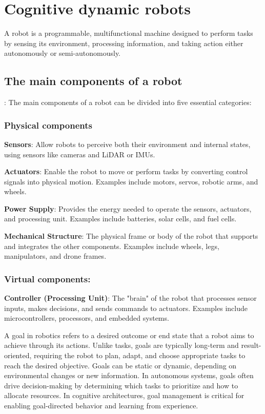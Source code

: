 \chapter{Cognitive dynamic robots}
A robot is a programmable, multifunctional machine designed to perform tasks by sensing its environment, processing information, and taking action either autonomously or semi-autonomously. \cite{siciliano-2016-springer-handbook-robotics}

\section{The main components of a robot}:
The main components of a robot can be divided into five essential categories:

    \subsection{Physical components}
        \textbf{Sensors}: Allow robots to perceive both their environment and internal states, using sensors like cameras and LiDAR or IMUs.
        
        \textbf{Actuators}: Enable the robot to move or perform tasks by converting control signals into physical motion.
        Examples include motors, servos, robotic arms, and wheels.
    
        \textbf{Power Supply}: Provides the energy needed to operate the sensors, actuators, and processing unit.
        Examples include batteries, solar cells, and fuel cells.
    
        \textbf{Mechanical Structure}: The physical frame or body of the robot that supports and integrates the other components.
        Examples include wheels, legs, manipulators, and drone frames.

    \subsection{Virtual components:}
        \textbf{Controller (Processing Unit)}: The "brain" of the robot that processes sensor inputs, makes decisions, and sends commands to actuators.
        Examples include microcontrollers, processors, and embedded systems.

         A goal in robotics refers to a desired outcome or end state that a robot aims to achieve through its actions. Unlike tasks, goals are typically long-term and result-oriented, requiring the robot to plan, adapt, and choose appropriate tasks to reach the desired objective. Goals can be static or dynamic, depending on environmental changes or new information. In autonomous systems, goals often drive decision-making by determining which tasks to prioritize and how to allocate resources. In cognitive architectures, goal management is critical for enabling goal-directed behavior and learning from experience.
        \cite{scassellati-2001-goal-directed-behavior-in-robotics}
        
